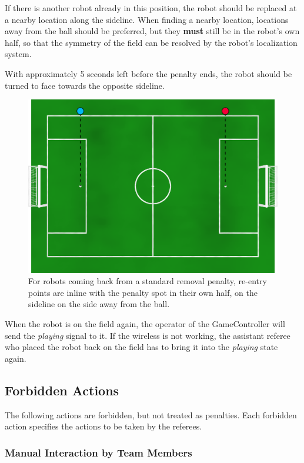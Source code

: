 \documentclass[12pt]{article}
\begin{document}
If there is another robot already in this position, the robot should be replaced at a nearby location along the sideline. When finding a nearby location, locations away from the ball should be preferred, but they \textbf{must} still be in the robot's own half, so that the symmetry of the field can be resolved by the robot's localization system.

With approximately 5 seconds left before the penalty ends, the robot should be turned to face towards the opposite sideline.

\begin{figure}[t]
\centerline{\includegraphics[width=\columnwidth]{figs/penalty_re-entry_points_2020.png}}
\caption{For robots coming back from a standard removal penalty, re-entry points  are inline with the penalty spot in their own half, on the sideline on the side away from the ball.}
\label{fig:penalty_re-entry_points}
\end{figure}

When the robot is on the field again, the operator of the GameController will send the \emph{playing} signal to it. If the wireless is not working, the assistant referee who placed the robot back on the field has to bring it into the \emph{playing} state again.


\subsection{Forbidden Actions}

The following actions are forbidden, but not treated as penalties.
Each forbidden action specifies the actions to be taken by the referees.

\subsubsection{Manual Interaction by Team Members}
\end{document}
